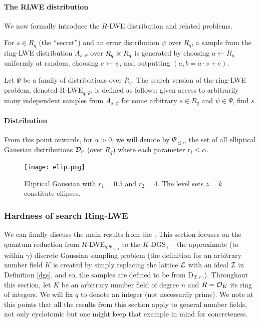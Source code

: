 \paragraph{The RLWE distribution}
We now formally introduce the $R$-LWE distribution and related problems.
\begin{definition}
	For $s \in R_q$ (the ``secret'') and an error distribution $\psi$ over $R_q$, a sample from the ring-LWE distribution $A_{s, \psi}$ over $R_q \cross R_q$ is generated by choosing $a \leftarrow R_q$ uniformly at random, choosing $e \leftarrow \psi$, and outputting $(a, b = a \cdot s + e)$.
\end{definition}
\begin{definition}
	Let $\Psi$ be a family of distributions over $R_q$. The search version of the ring-LWE problem, denoted R-LWE$_{q, \Psi}$, is defined as follows: given access to arbitrarily many independent samples from $A_{s, \psi}$ for some arbitrary $s \in R_q$ and $\psi \in \Psi$, find $s$.
\end{definition}
\paragraph{Distribution}
From this point onwards, for $\alpha > 0$, we will denote by $\Psi_{\leq \alpha}$ the set of all elliptical Gaussian distributions $\mathcal{D}_{\boldsymbol{r}}$ (over $R_q$) where each parameter $r_i \leq \alpha$.
\begin{figure}[ht]
	\centering
	\texttt{[image: elip.png]}
	\caption{Eliptical Gaussian with $r_1 = 0.5$ and $r_2 = 4$. The level sets $z=k$ constitute ellipses.}
	\label{elip-gauss}
\end{figure}
\subsubsection{Hardness of search Ring-LWE}\label{h-rlwe}
We can finally discuss the main results from the \cite{ring-lwe}. This section focuses on the quantum reduction from $R$-LWE$_{q, \Psi_{\leq \alpha}}$ to the $K$-DGS$_{\gamma}$ -- the approximate (to within $\gamma$) discrete Gaussian sampling problem (the definition for an arbitrary number field $K$ is created by simply replacing the lattice $\mathcal{L}$ with an ideal $\mathcal{I}$ in Definition \ref{dgs}, and so, the samples are defined to be from D$_{\mathcal{I}, r}$.). Throughout this section, let $K$ be an arbitrary number field of degree $n$ and $R = \mathcal{O}_K$ its ring of integers. We will fix $q$ to denote an integer (not necessarily prime). We note at this points that all the results from this section apply to general number fields, not only cyclotomic but one might keep that example in mind for concreteness.

